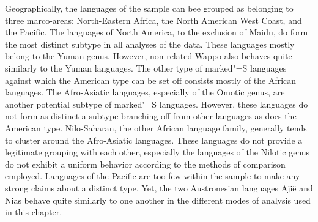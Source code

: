 Geographically, the languages of the sample can bee grouped as belonging to three marco-areas: North-Eastern Africa, the North American West Coast, and the Pacific. 
The languages of North America, to the exclusion of Maidu, do form the most distinct subtype in all analyses of the data. These languages mostly belong to the Yuman genus. 
However, non-related Wappo also behaves quite similarly to the Yuman languages. The other type of marked"=S languages against which the American type can be set off consists mostly of the African languages. 
The Afro-Asiatic languages, especially of the Omotic genus, are another potential subtype of marked"=S languages. 
However, these languages do not form as distinct a subtype branching off from other languages as does the American type. 
Nilo-Saharan, the other African language family, generally tends to cluster around the Afro-Asiatic languages. 
These languages do not provide a legitimate grouping with each other, especially the languages of the Nilotic genus do not exhibit a uniform behavior according to the methods of comparison employed. 
Languages of the Pacific are too few within the sample to make any strong claims about a distinct type. 
Yet, the two Austronesian languages Aji\"e and Nias behave quite similarly to one another in the different modes of analysis used in this chapter.  


